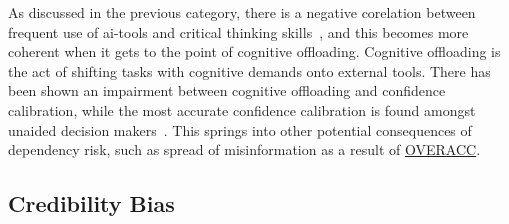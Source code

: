 As discussed in the previous category, there is a negative corelation between frequent use of \gls{ai}-tools and critical thinking skills\ \cite{gerlich_ai_2025}, and this becomes more coherent when it gets to the point of cognitive offloading. Cognitive offloading is the act of shifting tasks with cognitive demands onto external tools. There has been shown an impairment between cognitive offloading and confidence calibration, while the most accurate confidence calibration is found amongst unaided decision makers\ \cite{cheatle_accurate_2026}. This springs into other potential consequences of dependency risk, such as spread of misinformation as a result of \hyperref[overacc]{OVERACC}.

\subsection{Credibility Bias}\label{credbias}
